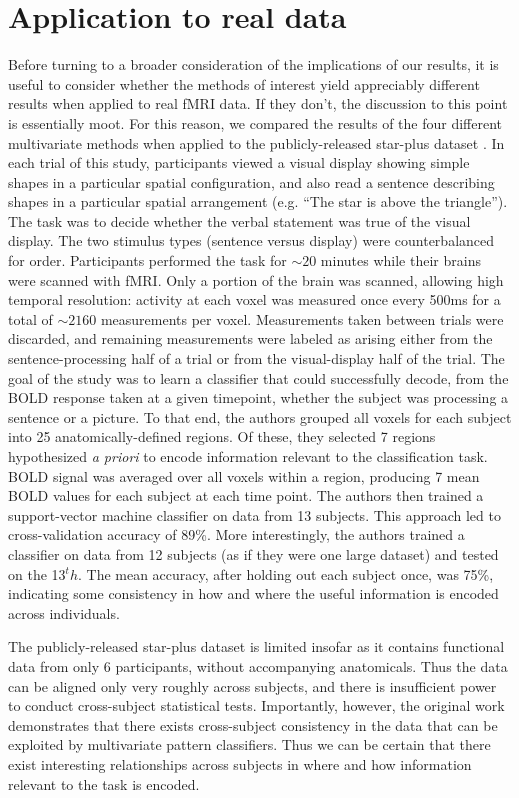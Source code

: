 \section{Application to real data}

Before turning to a broader consideration of the implications of our results, it is useful to consider whether the methods of interest yield appreciably different results when applied to real fMRI data. If they don't, the discussion to this point is essentially moot. For this reason, we compared the results of the four different multivariate methods when applied to the publicly-released star-plus dataset \cite{mitchell_learning_2004}. In each trial of this study, participants viewed a visual display showing simple shapes in a particular spatial configuration, and also read a sentence describing shapes in a particular spatial arrangement (e.g. ``The star is above the triangle''). The task was to decide whether the verbal statement was true of the visual display. The two stimulus types (sentence versus display) were counterbalanced for order. Participants performed the task for $\sim20$ minutes while their brains were scanned with fMRI. Only a portion of the brain was scanned, allowing high temporal resolution: activity at each voxel was measured once every 500ms for a total of $\sim2160$ measurements per voxel. Measurements taken between trials were discarded, and remaining measurements were labeled as arising either from the sentence-processing half of a trial or from the visual-display half of the trial. The goal of the study was to learn a classifier that could successfully decode, from the BOLD response taken at a given timepoint, whether the subject was processing a sentence or a picture. To that end, the authors grouped all voxels for each subject into 25 anatomically-defined regions. Of these, they selected 7 regions hypothesized {\em a priori} to encode information relevant to the classification task. BOLD signal was averaged over all voxels within a region, producing 7 mean BOLD values for each subject at each time point. The authors then trained a support-vector machine classifier on data from 13 subjects. This approach led to cross-validation accuracy of 89\%. More interestingly, the authors  trained a classifier on data from 12 subjects (as if they were one large dataset) and tested on the 13$^th$. The mean accuracy, after holding out each subject once, was 75\%, indicating some consistency in how and where the useful information is encoded across individuals.

The publicly-released star-plus dataset is limited insofar as it contains functional data from only 6 participants, without accompanying anatomicals. Thus the data can be aligned only very roughly across subjects, and there is insufficient power to conduct cross-subject statistical tests. Importantly, however, the original work demonstrates that there exists cross-subject consistency in the data that can be exploited by multivariate pattern classifiers. Thus we can be certain that there exist interesting relationships across subjects in where and how information relevant to the task is encoded.

